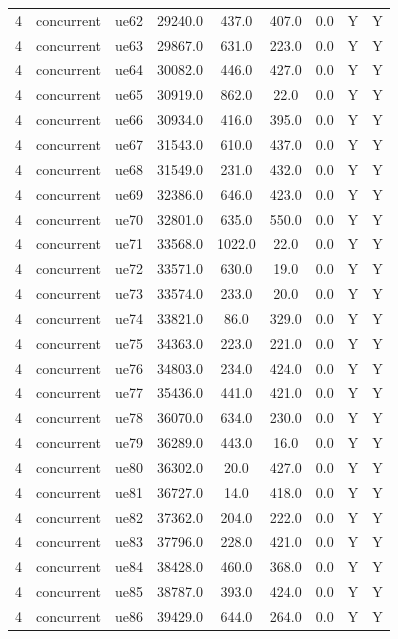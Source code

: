 \begin{table}[ht]
\begin{tabular}{|c|c|c|c|c|c|c|c|c|}
4 & concurrent & ue62 & 29240.0 & 437.0 & 407.0 & 0.0 & Y & Y \\
4 & concurrent & ue63 & 29867.0 & 631.0 & 223.0 & 0.0 & Y & Y \\
4 & concurrent & ue64 & 30082.0 & 446.0 & 427.0 & 0.0 & Y & Y \\
4 & concurrent & ue65 & 30919.0 & 862.0 & 22.0 & 0.0 & Y & Y \\
4 & concurrent & ue66 & 30934.0 & 416.0 & 395.0 & 0.0 & Y & Y \\
4 & concurrent & ue67 & 31543.0 & 610.0 & 437.0 & 0.0 & Y & Y \\
4 & concurrent & ue68 & 31549.0 & 231.0 & 432.0 & 0.0 & Y & Y \\
4 & concurrent & ue69 & 32386.0 & 646.0 & 423.0 & 0.0 & Y & Y \\
4 & concurrent & ue70 & 32801.0 & 635.0 & 550.0 & 0.0 & Y & Y \\
4 & concurrent & ue71 & 33568.0 & 1022.0 & 22.0 & 0.0 & Y & Y \\
4 & concurrent & ue72 & 33571.0 & 630.0 & 19.0 & 0.0 & Y & Y \\
4 & concurrent & ue73 & 33574.0 & 233.0 & 20.0 & 0.0 & Y & Y \\
4 & concurrent & ue74 & 33821.0 & 86.0 & 329.0 & 0.0 & Y & Y \\
4 & concurrent & ue75 & 34363.0 & 223.0 & 221.0 & 0.0 & Y & Y \\
4 & concurrent & ue76 & 34803.0 & 234.0 & 424.0 & 0.0 & Y & Y \\
4 & concurrent & ue77 & 35436.0 & 441.0 & 421.0 & 0.0 & Y & Y \\
4 & concurrent & ue78 & 36070.0 & 634.0 & 230.0 & 0.0 & Y & Y \\
4 & concurrent & ue79 & 36289.0 & 443.0 & 16.0 & 0.0 & Y & Y \\
4 & concurrent & ue80 & 36302.0 & 20.0 & 427.0 & 0.0 & Y & Y \\
4 & concurrent & ue81 & 36727.0 & 14.0 & 418.0 & 0.0 & Y & Y \\
4 & concurrent & ue82 & 37362.0 & 204.0 & 222.0 & 0.0 & Y & Y \\
4 & concurrent & ue83 & 37796.0 & 228.0 & 421.0 & 0.0 & Y & Y \\
4 & concurrent & ue84 & 38428.0 & 460.0 & 368.0 & 0.0 & Y & Y \\
4 & concurrent & ue85 & 38787.0 & 393.0 & 424.0 & 0.0 & Y & Y \\
4 & concurrent & ue86 & 39429.0 & 644.0 & 264.0 & 0.0 & Y & Y \\

\end{tabular}
\end{table}
